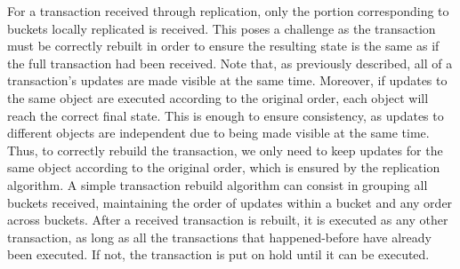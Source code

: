 
For a transaction received through replication, only the portion corresponding to buckets locally replicated is received.
This poses a challenge as the transaction must be correctly rebuilt in order to ensure the resulting state is the same as if the full transaction had been received.
Note that, as previously described, all of a transaction's updates are made visible at the same time.
Moreover, if updates to the same object are executed according to the original order, each object will reach the correct final state.
This is enough to ensure consistency, as updates to different objects are independent due to being made visible at the same time.
Thus, to correctly rebuild the transaction, we only need to keep updates for the same object according to the original order, which is ensured by the replication algorithm.
A simple transaction rebuild algorithm can consist in grouping all buckets received, maintaining the order of updates within a bucket and any order across buckets.
After a received transaction is rebuilt, it is executed as any other transaction, as long as all the transactions that happened-before have already been executed. 
If not, the transaction is put on hold until it can be executed.

